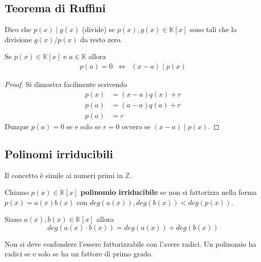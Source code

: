 \subsection{Teorema di Ruffini}
\begin{defn}
	Dico che $p(x) \mid g(x)$ (divide) se $p(x), g(x) \in \mathbb{K}[x]$ sono tali che
	la divisione $g(x) / p(x)$ da resto zero.
\end{defn}

\begin{theorem}
	Se $p(x) \in \mathbb{K}[x]$ e $a \in \mathbb{K}$ allora
	\begin{equation*}
		\begin{array}{ccc}
			p(a) = 0 & \Leftrightarrow & (x - a) \mid p(x)
		\end{array}
	\end{equation*}
	\begin{proof}
		Si dimostra facilmente scrivendo
		\begin{equation*}
			\begin{array}{ll}
				p(x) & = (x - a) q(x) + r \\
				p(a) & = (a - a) q(a) + r \\
				p(a) & = r
			\end{array}
		\end{equation*}
		Dunque $p(a) = 0$ se e solo se $r = 0$ ovvero se $(x - a) \mid p(x)$.
	\end{proof}
\end{theorem}

\subsection{Polinomi irriducibili}
Il concetto \`e simile ai numeri primi in $\mathbb{Z}$.

\begin{defn}
	Chiamo $p(x) \in \mathbb{K}[x]$ \textbf{polinomio irriducibile} se non si fattorizza nella
	forma $p(x) = a(x)b(x)$ con $deg(a(x)), deg(b(x)) < deg(p(x))$.
\end{defn}

\begin{observation}
	Siano $a(x), b(x) \in \mathbb{K}[x]$ allora
	\begin{equation*}
		deg(a(x) \cdot b(x)) = deg(a(x)) + deg(b(x))
	\end{equation*}
\end{observation}

\begin{observation}
	Non si deve confondere l'essere fattorizzabile con l'avere radici. Un polinomio ha
	radici se e solo se ha un fattore di primo grado.
\end{observation}

